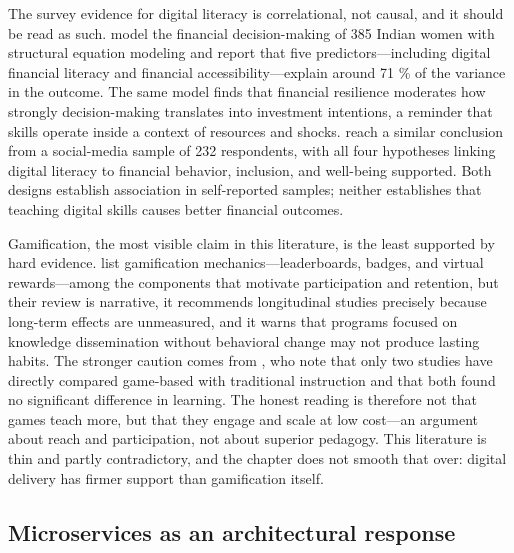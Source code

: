 The survey evidence for digital literacy is correlational, not causal, and it
should be read as such. \textcite{mishra2024digital} model the financial
decision-making of 385 Indian women with structural equation modeling and
report that five predictors---including digital financial literacy and
financial accessibility---explain around 71 \% of the variance in the
outcome. The same model finds that financial resilience moderates how
strongly decision-making translates into investment intentions, a reminder
that skills operate inside a context of resources and shocks.
\textcite{alafeef2025digital} reach a similar conclusion from a
social-media sample of 232 respondents, with all four hypotheses linking
digital literacy to financial behavior, inclusion, and well-being supported.
Both designs establish association in self-reported samples; neither
establishes that teaching digital skills causes better financial outcomes.

Gamification, the most visible claim in this literature, is the least
supported by hard evidence. \textcite{mancone2024youth} list gamification
mechanics---leaderboards, badges, and virtual rewards---among the components
that motivate participation and retention, but their review is narrative, it
recommends longitudinal studies precisely because long-term effects are
unmeasured, and it warns that programs focused on knowledge dissemination
without behavioral change may not produce lasting habits. The stronger
caution comes from \textcite{cannistra2024impact}, who note that only two
studies have directly compared game-based with traditional instruction and
that both found no significant difference in learning. The honest reading is
therefore not that games teach more, but that they engage and scale at low
cost---an argument about reach and participation, not about superior
pedagogy. This literature is thin and partly contradictory, and the chapter
does not smooth that over: digital delivery has firmer support than
gamification itself.

\subsection{Microservices as an architectural response}

